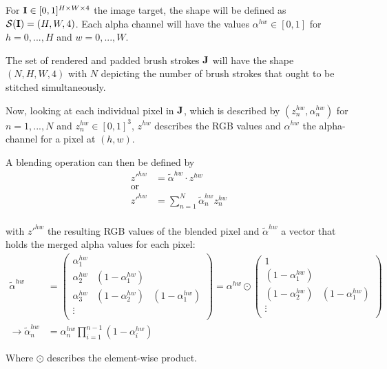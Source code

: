 For $\mathbf{I} \in [0, 1]^{H \times W \times 4} $ the image target, the shape will be defined
as $\mathcal{S}(\mathbf{I}) = (H, W, 4)$.
Each alpha channel will have the values $\alpha^{hw} \in [0, 1]$ for $h = 0, ..., H$ and $w = 0, ..., W$.

The set of rendered and padded brush strokes $\mathbf{J}$ will have the shape $(N, H, W, 4)$
with $N$ depicting the number of brush strokes that ought to be stitched simultaneously.

Now, looking at each individual pixel in $\mathbf{J}$, which is described by $(z^{hw}_n, \alpha^{hw}_n)$
for $n = 1, ..., N$ and $z^{hw}_n \in [0, 1]^{3}$, $z^{hw}$ describes the RGB values
and $\alpha^{hw}$ the alpha-channel for a pixel at $(h, w)$.

A blending operation can then be defined by
\begin{align}
    z'^{hw} & = \tilde{\alpha}^{hw} \cdot z^{hw} \\
    \text{or} \\
    z'^{hw} & = \sum_{n=1}^N \tilde{\alpha}^{hw}_n  z^{hw}_n \\
\end{align}

with $z'^{hw}$ the resulting RGB values of the blended pixel and $\tilde{\alpha}^{hw}$
a vector that holds the merged alpha values for each pixel:
\begin{align}
    \tilde{\alpha}^{hw} & =
    \begin{pmatrix}
        \alpha^{hw}_1 & &\\
        \alpha^{hw}_2 & (1 - \alpha^{hw}_1) &\\
        \alpha^{hw}_3 & (1 - \alpha^{hw}_2) & (1 - \alpha^{hw}_1)\\
        \vdots & &\\
    \end{pmatrix}
    = \alpha^{hw} \odot 
    \begin{pmatrix}
        1  &\\
        (1 - \alpha^{hw}_1) &\\
        (1 - \alpha^{hw}_2) & (1 - \alpha^{hw}_1)\\
        \vdots &\\
    \end{pmatrix}
    \\
    \rightarrow  \tilde{\alpha}^{hw}_n & = \alpha^{hw}_n \prod^{n-1}_{i=1} (1 - \alpha^{hw}_i)
\end{align}

Where $\odot$ describes the element-wise product.

